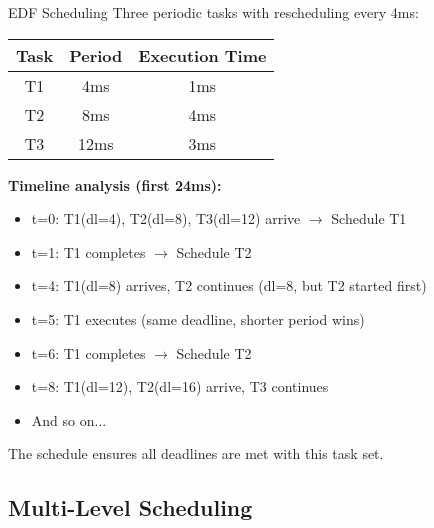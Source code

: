 \begin{example2}{EDF Scheduling}
    Three periodic tasks with rescheduling every 4ms:
    
    \begin{tabular}{|c|c|c|}
        \hline
        Task & Period & Execution Time \\
        \hline
        T1 & 4ms & 1ms \\
        T2 & 8ms & 4ms \\
        T3 & 12ms & 3ms \\
        \hline
    \end{tabular}
    
    \tcblower
    
    \textbf{Timeline analysis (first 24ms):}
    \begin{itemize}
        \item t=0: T1(dl=4), T2(dl=8), T3(dl=12) arrive $\rightarrow$ Schedule T1
        \item t=1: T1 completes $\rightarrow$ Schedule T2  
        \item t=4: T1(dl=8) arrives, T2 continues (dl=8, but T2 started first)
        \item t=5: T1 executes (same deadline, shorter period wins)
        \item t=6: T1 completes $\rightarrow$ Schedule T2
        \item t=8: T1(dl=12), T2(dl=16) arrive, T3 continues
        \item And so on...
    \end{itemize}
    
    The schedule ensures all deadlines are met with this task set.
\end{example2}

\subsection{Multi-Level Scheduling}

